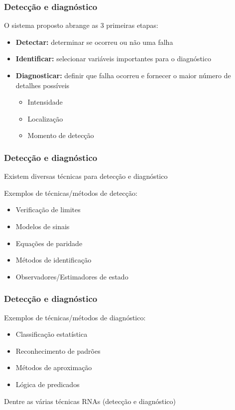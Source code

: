 \documentclass{beamer}
\begin{document}
\begin{frame}
    \frametitle{Detecção e diagnóstico}

    O sistema proposto abrange as 3 primeiras etapas:

\begin{itemize}
    \item {\bf Detectar:} determinar se ocorreu ou não uma falha
    \item {\bf Identificar:} selecionar variáveis importantes para o diagnóstico
    \item {\bf Diagnosticar:} definir que falha ocorreu e fornecer o maior
          número de detalhes possíveis
    \begin{itemize}
        \item Intensidade
        \item Localização
        \item Momento de detecção
    \end{itemize}
\end{itemize}
\end{frame}

\begin{frame}
    \frametitle{Detecção e diagnóstico}

    Existem diversas técnicas para detecção e diagnóstico

    \vspace{0.25cm}

    Exemplos de técnicas/métodos de detecção:
\begin{itemize}
    \item Verificação de limites
    \item Modelos de sinais
    \item Equações de paridade
    \item Métodos de identificação
    \item Observadores/Estimadores de estado
\end{itemize}
\end{frame}

\begin{frame}
    \frametitle{Detecção e diagnóstico}

    Exemplos de técnicas/métodos de diagnóstico:
\begin{itemize}
    \item Classificação estatística
    \item Reconhecimento de padrões
    \item Métodos de aproximação
    \item Lógica de predicados
\end{itemize}

    \vspace{0.25cm}

    Dentre as várias técnicas \implica RNAs (detecção e diagnóstico)
\end{frame}
\end{document}
